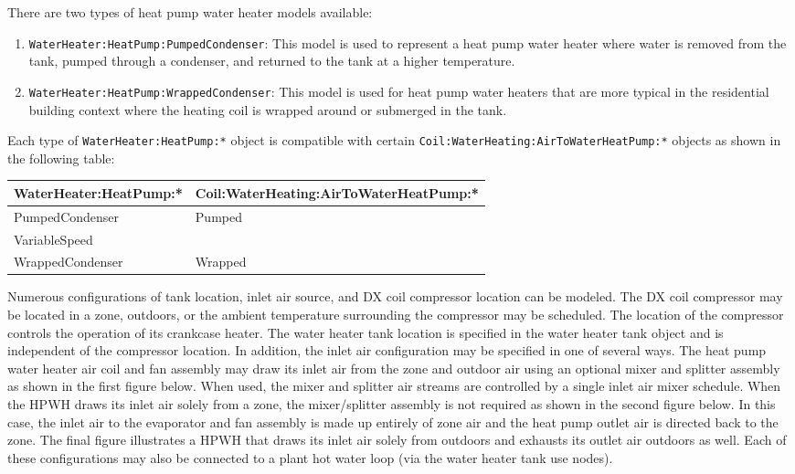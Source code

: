 There are two types of heat pump water heater models available:

\begin{enumerate}
\def\labelenumi{\arabic{enumi}.}
\tightlist
\item
  \lstinline!WaterHeater:HeatPump:PumpedCondenser!: This model is used to represent a heat pump water heater where water is removed from the tank, pumped through a condenser, and returned to the tank at a higher temperature.
\item
  \lstinline!WaterHeater:HeatPump:WrappedCondenser!: This model is used for heat pump water heaters that are more typical in the residential building context where the heating coil is wrapped around or submerged in the tank.
\end{enumerate}

Each type of \lstinline!WaterHeater:HeatPump:*! object is compatible with certain \lstinline!Coil:WaterHeating:AirToWaterHeatPump:*! objects as shown in the following table:

\begin{longtable}[c]{@{}ll@{}}
\toprule 
WaterHeater:HeatPump:* & Coil:WaterHeating:AirToWaterHeatPump:* \tabularnewline \midrule
\endhead
PumpedCondenser & Pumped \tabularnewline
VariableSpeed \tabularnewline
WrappedCondenser & Wrapped \tabularnewline
\bottomrule
\end{longtable}

Numerous configurations of tank location, inlet air source, and DX coil compressor location can be modeled. The DX coil compressor may be located in a zone, outdoors, or the ambient temperature surrounding the compressor may be scheduled. The location of the compressor controls the operation of its crankcase heater. The water heater tank location is specified in the water heater tank object and is independent of the compressor location. In addition, the inlet air configuration may be specified in one of several ways. The heat pump water heater air coil and fan assembly may draw its inlet air from the zone and outdoor air using an optional mixer and splitter assembly as shown in the first figure below. When used, the mixer and splitter air streams are controlled by a single inlet air mixer schedule. When the HPWH draws its inlet air solely from a zone, the mixer/splitter assembly is not required as shown in the second figure below. In this case, the inlet air to the evaporator and fan assembly is made up entirely of zone air and the heat pump outlet air is directed back to the zone. The final figure illustrates a HPWH that draws its inlet air solely from outdoors and exhausts its outlet air outdoors as well. Each of these configurations may also be connected to a plant hot water loop (via the water heater tank use nodes).

